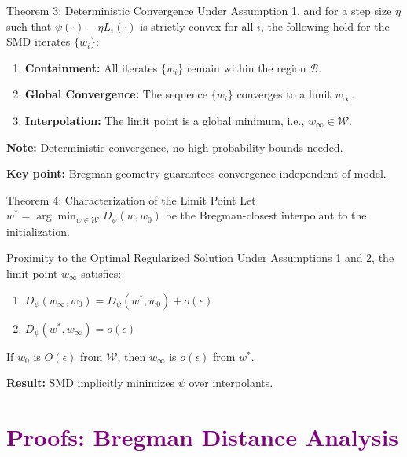 \documentclass[aspectratio=169]{beamer}
\begin{document}
\begin{frame}{Theorem 3: Deterministic Convergence}
    Under Assumption 1, and for a step size $\eta$ such that $\psi(\cdot) - \eta L_i(\cdot)$ is strictly convex for all $i$, the following hold for the SMD iterates $\{w_i\}$:
    
    \begin{enumerate}
        \item \textbf{Containment:} All iterates $\{w_i\}$ remain within the region $\mathcal{B}$.
        \item \textbf{Global Convergence:} The sequence $\{w_i\}$ converges to a limit $w_\infty$.
        \item \textbf{Interpolation:} The limit point is a global minimum, i.e., $w_\infty \in \mathcal{W}$.
    \end{enumerate}
    \vspace{0.3cm}
    \textbf{Note:} Deterministic convergence, no high-probability bounds needed.
    
    \vspace{0.2cm}
    \textbf{Key point:} Bregman geometry guarantees convergence independent of model.
\end{frame}

\begin{frame}{Theorem 4: Characterization of the Limit Point}
    Let $w^* = \arg\min_{w \in \mathcal{W}} D_\psi(w, w_0)$ be the Bregman-closest interpolant to the initialization.
    
    \begin{block}{Proximity to the Optimal Regularized Solution}
        Under Assumptions 1 and 2, the limit point $w_\infty$ satisfies:
        \begin{enumerate}
            \item $D_\psi(w_\infty, w_0) = D_\psi(w^*, w_0) + o(\epsilon)$
            \item $D_\psi(w^*, w_\infty) = o(\epsilon)$
        \end{enumerate}
    \end{block}
    \vspace{0.2cm}
    If $w_0$ is $O(\epsilon)$ from $\mathcal{W}$, then $w_\infty$ is $o(\epsilon)$ from $w^*$.
    
    \textbf{Result:} SMD implicitly minimizes $\psi$ over interpolants.
\end{frame}


\section{\textbf{\textcolor{purple}{Proofs: Bregman Distance Analysis}}}
\end{document}
